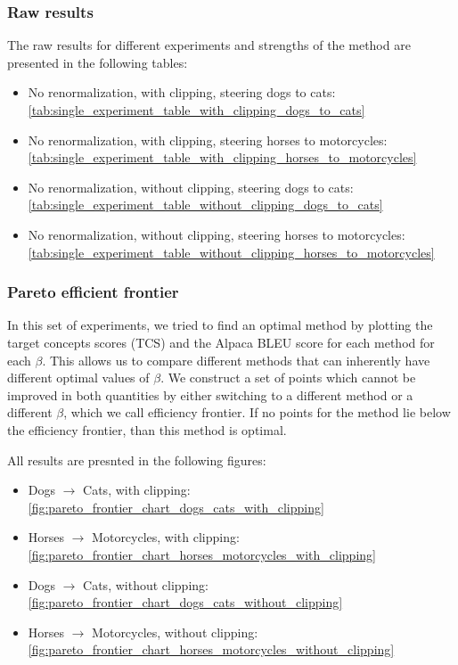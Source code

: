 \subsubsection{Raw results}

The raw results for different experiments and strengths of the method are presented in the following tables:
\begin{itemize}
    \item No renormalization, with clipping, steering dogs to cats: \ref{tab:single_experiment_table_with_clipping_dogs_to_cats}

    \item No renormalization, with clipping, steering horses to motorcycles: \ref{tab:single_experiment_table_with_clipping_horses_to_motorcycles}

    \item No renormalization, without clipping, steering dogs to cats: \ref{tab:single_experiment_table_without_clipping_dogs_to_cats}

    \item No renormalization, without clipping, steering horses to motorcycles: \ref{tab:single_experiment_table_without_clipping_horses_to_motorcycles}
\end{itemize}


\subsubsection{Pareto efficient frontier}

In this set of experiments, we tried to find an optimal method by plotting the target concepts scores (TCS) and the Alpaca BLEU score for each method for each $\beta$. This allows us to compare different methods that can inherently have different optimal values of $\beta$. We construct a set of points which cannot be improved in both quantities by either switching to a different method or a different $\beta$, which we call efficiency frontier. If no points for the method lie below the efficiency frontier, than this method is optimal.

All results are presnted in the following figures:

\begin{itemize}
    \item Dogs $\to$ Cats, with clipping: \ref{fig:pareto_frontier_chart_dogs_cats_with_clipping}
    \item Horses $\to$ Motorcycles, with clipping: \ref{fig:pareto_frontier_chart_horses_motorcycles_with_clipping}
    \item Dogs $\to$ Cats, without clipping: \ref{fig:pareto_frontier_chart_dogs_cats_without_clipping}
    \item Horses $\to$ Motorcycles, without clipping: \ref{fig:pareto_frontier_chart_horses_motorcycles_without_clipping}
\end{itemize}

